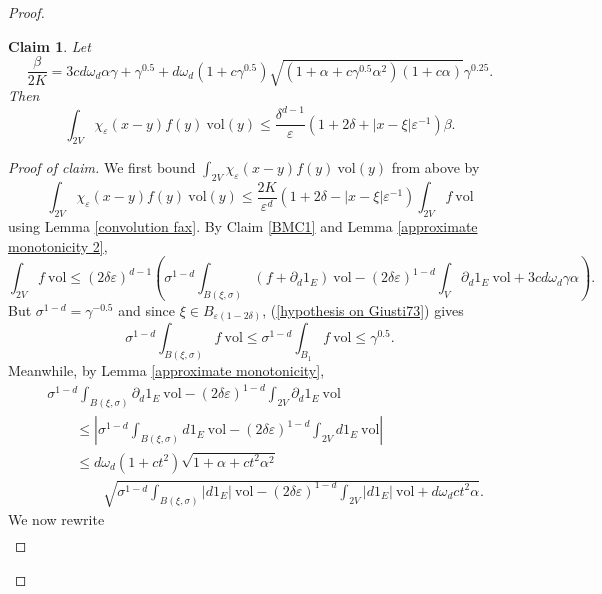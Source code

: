 \documentclass[reqno,12pt,letterpaper]{amsart}
\newcommand{\vol}{\mathrm{vol}}
\newtheorem{claim}[theorem]{Claim}
\theoremstyle{definition}
\numberwithin{equation}{section}
\begin{document}
\begin{proof}
\begin{claim}\label{BMC2}
Let
\begin{equation}\label{definition of beta}
\frac{\beta}{2K} = 3cd\omega_d\alpha\gamma + \gamma^{0.5} + d\omega_d(1 + c\gamma^{0.5})\sqrt{(1 + \alpha + c\gamma^{0.5}\alpha^2)(1 + c\alpha)}\gamma^{0.25}.
\end{equation}
Then
\begin{equation}\label{kernel eliminated}
\int_{2V} \chi_\varepsilon(x - y)f(y) ~\vol(y) \leq \frac{\delta^{d - 1}}{\varepsilon}(1 + 2\delta + |x - \xi|\varepsilon^{-1})\beta.
\end{equation}
\end{claim}
\begin{proof}[Proof of claim]
We first bound $\int_{2V} \chi_\varepsilon(x - y)f(y) ~\vol(y)$ from above by
\begin{equation}\label{eliminate the kernel}
\int_{2V} \chi_\varepsilon(x - y)f(y) ~\vol(y) \leq \frac{2K}{\varepsilon^d}(1 + 2\delta - |x - \xi|\varepsilon^{-1}) \int_{2V} f ~\vol
\end{equation}
using Lemma \ref{convolution fax}.
By Claim \ref{BMC1} and Lemma \ref{approximate monotonicity 2},
$$\int_{2V} f~\vol \leq (2\delta\varepsilon)^{d - 1} \left(\sigma^{1 - d} \int_{B(\xi, \sigma)} (f + \partial_d1_E) ~\vol - (2\delta\varepsilon)^{1 - d} \int_V \partial_d1_E ~\vol + 3cd\omega_d\gamma\alpha\right).$$
But $\sigma^{1 - d} = \gamma^{-0.5}$ and since $\xi \in B_{\varepsilon(1 - 2\delta)}$, (\ref{hypothesis on Giusti73}) gives
\begin{equation}\label{we get sqrt gamma}
\sigma^{1 - d} \int_{B(\xi, \sigma)} f ~\vol \leq \sigma^{1 - d} \int_{B_1} f ~\vol \leq \gamma^{0.5}.
\end{equation}
Meanwhile, by Lemma \ref{approximate monotonicity},
\begin{align*}
&\sigma^{1 - d} \int_{B(\xi, \sigma)} \partial_d1_E ~\vol - (2\delta\varepsilon)^{1 - d} \int_{2V} \partial_d1_E ~\vol\\
& \qquad \leq \left|\sigma^{1 - d} \int_{B(\xi, \sigma)} d1_E ~\vol - (2\delta\varepsilon)^{1 - d} \int_{2V} d1_E ~\vol\right|\\
& \qquad \leq d\omega_d (1 + ct^2)\sqrt{1 + \alpha + ct^2 \alpha^2} \\
&\qquad \qquad \sqrt{\sigma^{1 - d} \int_{B(\xi, \sigma)} |d1_E| ~\vol - (2\delta\varepsilon)^{1 - d} \int_{2V} |d1_E| ~\vol + d\omega_dct^2\alpha}.
\end{align*}
We now rewrite
\begin{align*}

\end{align*}
\end{proof}
\end{proof}
\end{document}

